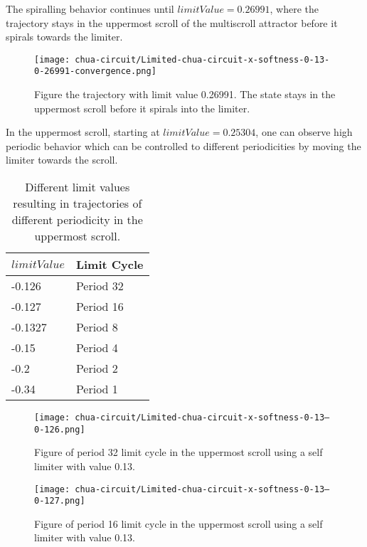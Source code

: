\documentclass[main]{subfiles}
\begin{document}
The spiralling behavior continues until \(limitValue=0.26991\), where the trajectory stays in the uppermost scroll of the multiscroll attractor before it spirals towards the limiter.

\begin{figure}[H]
\centering
\texttt{[image: chua-circuit/Limited-chua-circuit-x-softness-0-13-0-26991-convergence.png]}
\caption[Figure of trajectory with limit value 0.26991.]{Figure the trajectory with limit value 0.26991. The state stays in the uppermost scroll before it spirals into the limiter.}
\label{figure:x-0.13-upper-scroll-trajectory}
\end{figure}

In the uppermost scroll, starting at \(limitValue=0.25304\), one can observe high periodic behavior which can be controlled to different periodicities by moving the limiter towards the scroll. 

\begin{table}[H]
\renewcommand{\arraystretch}{1.2}
\center
\begin{tabular}{@{}ll@{}}
	\toprule
   \(limitValue\) & Limit Cycle\\
   \midrule
   -0.126 & Period 32 \\
   -0.127 & Period 16 \\
   -0.1327 & Period 8 \\ 
   -0.15 & Period 4 \\
   -0.2  & Period 2 \\
   -0.34 & Period 1 \\
   \bottomrule
\end{tabular}
\caption[Limiter values for periodic trajectories for for an x self-limiting limiter with softness 0.13]{Different limit values resulting in trajectories of different periodicity in the uppermost scroll.}
\label{table:x-0.13-periodicities}
\end{table}

\begin{figure}[H]
\centering
\texttt{[image: chua-circuit/Limited-chua-circuit-x-softness-0-13--0-126.png]}
\caption[Figure of period 32 limit cycle]{Figure of period 32 limit cycle in the uppermost scroll using a self limiter with value 0.13.}
\label{figure:x-0.13-32-limit-cycle-upperscroll-trajectory}
\end{figure}

\begin{figure}[H]
\centering
\texttt{[image: chua-circuit/Limited-chua-circuit-x-softness-0-13--0-127.png]}
\caption[Figure of period 16 limit cycle]{Figure of period 16 limit cycle in the uppermost scroll using a self limiter with value 0.13.}
\label{figure:x-0.13-16-limit-cycle-upperscroll-trajectory}
\end{figure}
\end{document}
